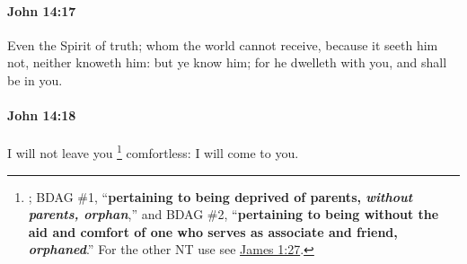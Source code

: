 		\paragraph{John 14:17} %
			\label{JOHN-14-17}

			Even the Spirit of truth; whom the world cannot receive, because it seeth him not, neither knoweth him: but ye know him; for he dwelleth with you, and shall be in you.

			\begin{framed}
				\scriptsize
				\begin{compactdesc}
					\item[SBLG] 
				\end{compactdesc}
			\end{framed}

		\paragraph{John 14:18} %
			\label{JOHN-14-18}

			I will not leave you
				\footnote{%
					; BDAG \#1, ``\textbf{pertaining to being deprived of parents, \textit{without parents, orphan}},'' and BDAG \#2, ``\textbf{pertaining to being without the aid and comfort of one who serves as associate and friend, \textit{orphaned}}.'' For the other NT use see \hyperref[JAMES-1-27]{James 1:27}.
					}%
			comfortless: I will come to you.

